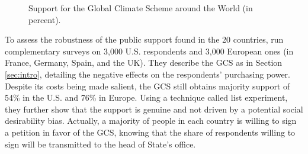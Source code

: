 \documentclass[12pt,english]{article}
\begin{document}
\begin{figure}[h!] 
    \caption{Support for the Global Climate Scheme around the World (in percent).}\label{fig:support}
\end{figure}

To assess the robustness of the public support found in the 20 countries, \citet{fabre_international_2023} run complementary surveys on 3,000 U.S. respondents and 3,000 European ones (in France, Germany, Spain, and the UK). They describe the GCS as in Section \ref{sec:intro}, detailing the negative effects on the respondents' purchasing power. Despite its costs being made salient, the GCS still obtains majority support of 54\% in the U.S. and 76\% in Europe. Using a technique called list experiment, they further show that the support is genuine and not driven by a potential social desirability bias. Actually, a majority of people in each country is willing to sign a petition in favor of the GCS, knowing that the share of respondents willing to sign will be transmitted to the head of State's office. 
\end{document}
